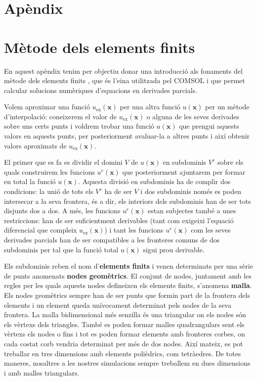 \documentclass{article}
\begin{document}
\newpage
\section*{Ap\`{e}ndix}
\appendix

\section{M\`{e}tode dels elements finits}\label{App:elements}

En aquest ap\`{e}ndix tenim per objectiu donar una introducci\'{o} als fonaments del m\`{e}tode dels elements finits \cite{dhatt2012finite}, que \'{e}s l'eina utilitzada pel COMSOL i que permet calcular solucions num\`{e}riques d'equacions en derivades parcials.

Volem aproximar una funci\'{o} $u_{\text{ex}}(\boldsymbol{x})$ per una altra funci\'{o} $u(\boldsymbol{x})$ per un m\`{e}tode d'interpolaci\'{o}: coneixerem el valor de $u_{\text{ex}}(\boldsymbol{x})$ o alguna de les seves derivades sobre uns certs punts i voldrem trobar una funci\'{o} $u(\boldsymbol{x})$ que prengui aquests valors en aquests punts, per posteriorment avaluar-la a altres punts i aix\'{i} obtenir valors aproximats de $u_{\text{ex}}(\boldsymbol{x})$. 

El primer que es fa es dividir el domini $V$ de $u(\boldsymbol{x})$ en subdominis $V^e$ sobre els quals construirem les funcions $u^e(\boldsymbol{x})$ que posteriorment ajuntarem per formar en total la funci\'{o} $u(\boldsymbol{x})$. Aquesta divisi\'{o} en subdominis ha de complir dos condicions: la uni\'{o} de tots els $V^e$ ha de ser $V$ i dos subdominis nom\'{e}s es poden intersecar a la seva frontera, \'{e}s a dir, els interiors dels subdominis han de ser tots disjunts dos a dos. A m\'{e}s, les funcions $u^e(\boldsymbol{x})$ estan subjectes tamb\'{e} a unes restriccions: han de ser suficientment derivables (tant com exigeixi l'equaci\'{o} diferencial que compleix $u_{\text{ex}}(\boldsymbol{x})$) i tant les funcions $u^e(\boldsymbol{x})$ com les seves derivades parcials han de ser compatibles a les fronteres comuns de dos subdominis per tal que la funci\'{o} total $u(\boldsymbol{x})$ sigui prou derivable.

Els subdominis reben el nom d'\textbf{elements finits} i venen determinats per una s\`{e}rie de punts anomenats \textbf{nodes geom\`{e}trics}. El conjunt de nodes, juntament amb les regles per les quals aquests nodes defineixen els elements finits, s'anomena \textbf{malla}. Els nodes geom\`{e}trics sempre han de ser punts que formin part de la frontera dels elements i un element queda un\'{i}vocament determinat pels nodes de la seva frontera. La malla bidimensional m\'{e}s senzilla \'{e}s una triangular on els nodes s\'{o}n els v\`{e}rtexs dels triangles. Tamb\'{e} es poden formar malles quadrangulars sent els v\`{e}rtexs els nodes o fins i tot es poden formar elements amb fronteres corbes, on cada costat corb vendria determinat per m\'{e}s de dos nodes. Aix\'{i} mateix, es pot treballar en tres dimensions amb elements poli\`{e}drics, com tetr\`{a}edres. De totes maneres, nosaltres a les nostres simulacions sempre treballem en dues dimensions i amb malles triangulars.
\end{document}
